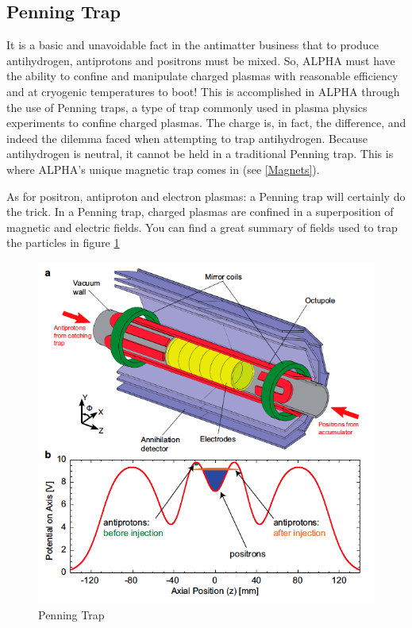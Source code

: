 \documentclass[12pt,a4paper]{article}
\begin{document}
\subsection{Penning Trap}
It is a basic and unavoidable fact in the antimatter business that to produce antihydrogen, antiprotons and positrons must be mixed. So, ALPHA must have the ability to confine and manipulate charged plasmas with reasonable efficiency and at cryogenic temperatures to boot!
This is accomplished in ALPHA through the use of Penning traps, a type of trap commonly used in plasma physics experiments to confine charged plasmas. The charge is, in fact, the difference, and indeed the dilemma faced when attempting to trap antihydrogen. Because antihydrogen is neutral, it cannot be held in a traditional Penning trap. This is where ALPHA’s unique magnetic trap comes in (see \ref{Magnets}).

As for positron, antiproton and electron plasmas: a Penning trap will certainly do the trick. In a Penning trap, charged plasmas are confined in a superposition of magnetic and electric fields. You can find a great summary of fields used to trap the particles in figure \ref{trap}

\begin{figure}[h]
\centering
\includegraphics[scale=0.4]{penning-trap-figure}
\caption{Penning Trap}
\label{trap}
\end{figure}
\end{document}
